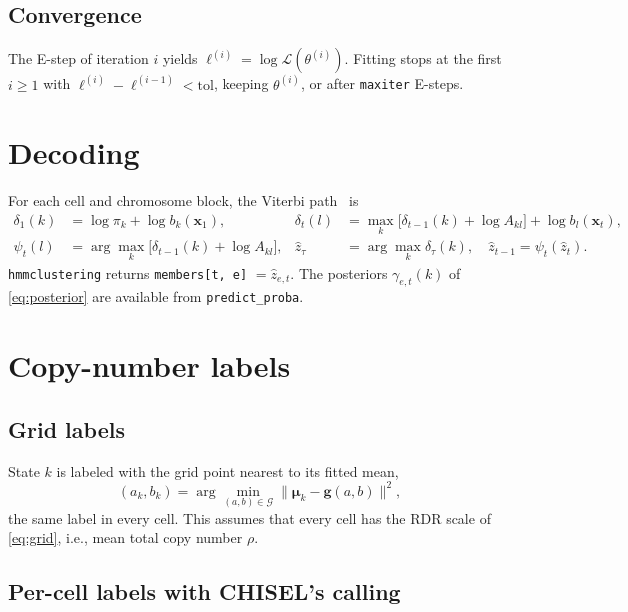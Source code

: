 \documentclass[11pt]{article}
\newcommand{\code}[1]{\texttt{#1}}
\newcommand{\x}{\mathbf{x}}
\begin{document}
\subsection{Convergence}\label{sec:convergence}

The E-step of iteration $i$ yields $\ell^{(i)} = \log\mathcal{L}(\theta^{(i)})$. Fitting stops at
the first $i \ge 1$ with $\ell^{(i)} - \ell^{(i-1)} < \text{tol}$, keeping $\theta^{(i)}$, or
after \code{maxiter} E-steps.

\section{Decoding}\label{sec:decoding}

For each cell and chromosome block, the Viterbi path~\cite{viterbi1967} is
\begin{align}
\delta_1(k) &= \log\pi_k + \log b_k(\x_1), &
\delta_t(l) &= \max_k \bigl[\delta_{t-1}(k) + \log A_{kl}\bigr] + \log b_l(\x_t),\\
\psi_t(l) &= \arg\max_k \bigl[\delta_{t-1}(k) + \log A_{kl}\bigr], &
\hat z_\tau &= \arg\max_k \delta_\tau(k), \quad \hat z_{t-1} = \psi_t(\hat z_t).
\end{align}
\code{hmmclustering} returns \code{members[t, e]} $= \hat z_{e,t}$. The posteriors
$\gamma_{e,t}(k)$ of \eqref{eq:posterior} are available from \code{predict\_proba}.

\section{Copy-number labels}\label{sec:labels}

\subsection{Grid labels}\label{sec:grid-labels}

State $k$ is labeled with the grid point nearest to its fitted mean,
\begin{equation}
(a_k, b_k) = \arg\min_{(a,b) \in \mathcal{G}} \lVert \bm\mu_k - \mathbf{g}(a,b) \rVert^2 ,
\end{equation}
the same label in every cell. This assumes that every cell has the RDR scale of
\eqref{eq:grid}, i.e., mean total copy number $\rho$.

\subsection{Per-cell labels with CHISEL's calling}\label{sec:calling}
\end{document}
